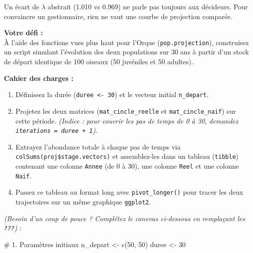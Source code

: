 \documentclass[
  french,
  a4paper,
  DIV=11,
  numbers=noendperiod,
  oneside]{scrreprt}
\newenvironment{Shaded}{}{}
\newcommand{\CommentTok}[1]{\textcolor[rgb]{0.42,0.45,0.49}{#1}}
\newcommand{\DecValTok}[1]{\textcolor[rgb]{0.00,0.36,0.77}{#1}}
\newcommand{\FunctionTok}[1]{\textcolor[rgb]{0.44,0.26,0.76}{#1}}
\newcommand{\NormalTok}[1]{\textcolor[rgb]{0.14,0.16,0.18}{#1}}
\newcommand{\OtherTok}[1]{\textcolor[rgb]{0.44,0.26,0.76}{#1}}
\providecommand{\tightlist}{%
  \setlength{\itemsep}{0pt}\setlength{\parskip}{0pt}}
\begin{document}
\begin{tcolorbox}[enhanced jigsaw, arc=.35mm, bottomrule=.15mm, bottomtitle=1mm, breakable, colback=white, colbacktitle=quarto-callout-note-color!10!white, colframe=quarto-callout-note-color-frame, coltitle=black, left=2mm, leftrule=.75mm, opacityback=0, opacitybacktitle=0.6, rightrule=.15mm, title=\textcolor{quarto-callout-note-color}{\faInfo}\hspace{0.5em}{Défi : Modéliser le décrochage des trajectoires temporelles {[}Optionnel
- Niveau Avancé{]}}, titlerule=0mm, toprule=.15mm, toptitle=1mm]

Un écart de \(\lambda\) abstrait (1.010 vs 0.969) ne parle pas toujours
aux décideurs. Pour convaincre un gestionnaire, rien ne vaut une courbe
de projection comparée.

\textbf{Votre défi :}\\
À l'aide des fonctions vues plus haut pour l'Orque
(\texttt{pop.projection}), construisez un script simulant l'évolution
des deux populations sur 30 ans à partir d'un stock de départ identique
de 100 oiseaux (50 juvéniles et 50 adultes).

\textbf{Cahier des charges :}

\begin{enumerate}
\def\labelenumi{\arabic{enumi}.}
\tightlist
\item
  Définissez la durée (\texttt{duree\ \textless{}-\ 30}) et le vecteur
  initial \texttt{n\_depart}.
\item
  Projetez les deux matrices (\texttt{mat\_cincle\_reelle} et
  \texttt{mat\_cincle\_naif}) sur cette période. \emph{(Indice : pour
  couvrir les pas de temps de 0 à 30, demandez
  \texttt{iterations\ =\ duree\ +\ 1})}.
\item
  Extrayez l'abondance totale à chaque pas de temps via
  \texttt{colSums(proj\$stage.vectors)} et assemblez-les dans un tableau
  (\texttt{tibble}) contenant une colonne \texttt{Annee} (de 0 à 30),
  une colonne \texttt{Reel} et une colonne \texttt{Naif}.
\item
  Passez ce tableau au format long avec \texttt{pivot\_longer()} pour
  tracer les deux trajectoires sur un même graphique \texttt{ggplot2}.
\end{enumerate}

\emph{(Besoin d'un coup de pouce ? Complétez le canevas ci-dessous en
remplaçant les \texttt{???})} :

\begin{Shaded}
\begin{Highlighting}[]
\CommentTok{\# 1. Paramètres initiaux}
\NormalTok{n\_depart }\OtherTok{\textless{}{-}} \FunctionTok{c}\NormalTok{(}\DecValTok{50}\NormalTok{, }\DecValTok{50}\NormalTok{)}
\NormalTok{duree    }\OtherTok{\textless{}{-}} \DecValTok{30}


\end{Highlighting}
\end{Shaded}
\end{tcolorbox}
\end{document}
